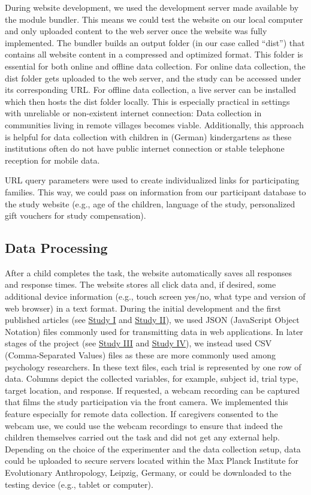 \documentclass[
]{scrbook}
\begin{document}
During website development, we used the development server made available by the module bundler. This means we could test the website on our local computer and only uploaded content to the web server once the website was fully implemented. The bundler builds an output folder (in our case called ``dist'') that contains all website content in a compressed and optimized format. This folder is essential for both online and offline data collection. For online data collection, the dist folder gets uploaded to the web server, and the study can be accessed under its corresponding URL. For offline data collection, a live server can be installed which then hosts the dist folder locally. This is especially practical in settings with unreliable or non-existent internet connection: Data collection in communities living in remote villages becomes viable. Additionally, this approach is helpful for data collection with children in (German) kindergartens as these institutions often do not have public internet connection or stable telephone reception for mobile data.

URL query parameters were used to create individualized links for participating families. This way, we could pass on information from our participant database to the study website (e.g., age of the children, language of the study, personalized gift vouchers for study compensation).

\subsection{Data Processing}\label{approach-dataprocessing}

After a child completes the task, the website automatically saves all responses and response times. The website stores all click data and, if desired, some additional device information (e.g., touch screen yes/no, what type and version of web browser) in a text format. During the initial development and the first published articles (see \hyperref[studyI]{Study I} and \hyperref[studyII]{Study II}), we used JSON (JavaScript Object Notation) files commonly used for transmitting data in web applications. In later stages of the project (see \hyperref[studyIII]{Study III} and \hyperref[studyIV]{Study IV}), we instead used CSV (Comma-Separated Values) files as these are more commonly used among psychology researchers. In these text files, each trial is represented by one row of data. Columns depict the collected variables, for example, subject id, trial type, target location, and response. If requested, a webcam recording can be captured that films the study participation via the front camera. We implemented this feature especially for remote data collection. If caregivers consented to the webcam use, we could use the webcam recordings to ensure that indeed the children themselves carried out the task and did not get any external help. Depending on the choice of the experimenter and the data collection setup, data could be uploaded to secure servers located within the Max Planck Institute for Evolutionary Anthropology, Leipzig, Germany, or could be downloaded to the testing device (e.g., tablet or computer).
\end{document}
